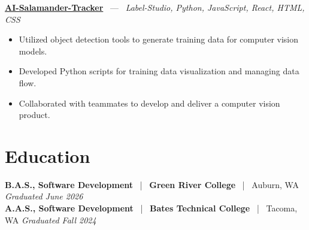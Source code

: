 \documentclass[10pt, letterpaper]{article}
\newcommand{\jobhead}[4]{%
  \vspace{5pt}%
  {\bfseries\color{dark}#1}%
  ~{\color{light}|}~%
  {\bfseries\color{navy}#2}%
  ~{\color{light}|}~%
  {\color{light}#3}%
  \hfill{\color{light}\small\textit{#4}}\\[-2pt]%
}
\newcommand{\projhead}[3]{%
  \vspace{5pt}%
  {\bfseries\color{dark}\href{#2}{#1}}%
  ~{\color{light}---}~%
  {\color{light}\small\textit{#3}}\\[-2pt]%
}
\begin{document}
\projhead{AI-Salamander-Tracker}{https://github.com/xavierb117/Salamander-Tracker-YOLO}{Label-Studio, Python, JavaScript, React, HTML, CSS}
\begin{itemize}
  \item Utilized object detection tools to generate training data for computer vision models.
  \item Developed Python scripts for training data visualization and managing data flow.
  \item Collaborated with teammates to develop and deliver a computer vision product.
\end{itemize}

\section{Education}

\jobhead{B.A.S., Software Development}{Green River College}{Auburn, WA}{Graduated June 2026}
\jobhead{A.A.S., Software Development}{Bates Technical College}{Tacoma, WA}{Graduated Fall 2024}
\end{document}
